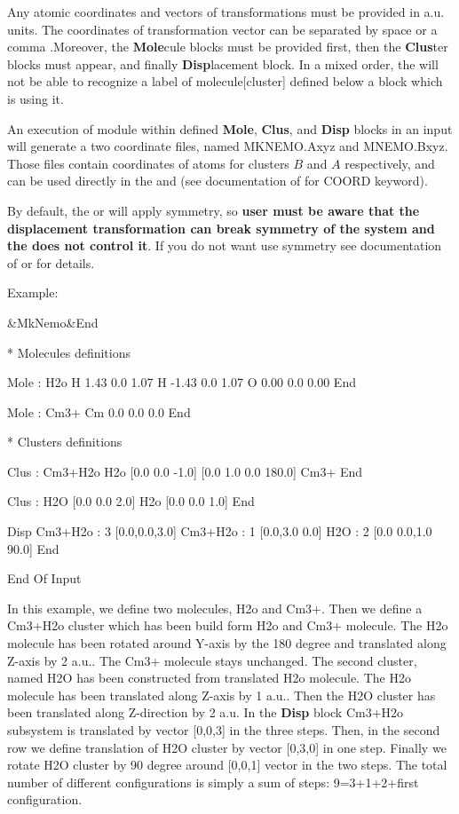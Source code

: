\begin{keywordlist}
Any atomic coordinates and vectors of transformations  must be provided in a.u. units. The coordinates of transformation vector can be separated by space or a comma .Moreover, the {\bf Mole}cule blocks must be provided first, then the {\bf Clus}ter blocks must appear, and finally  {\bf Disp}lacement block. In a mixed order, the  will not be able to recognize a label of molecule[cluster] defined below a block which is using it.

An execution of  module within defined {\bf Mole}, {\bf Clus}, and {\bf Disp} blocks in an input will generate a two coordinate files, named MKNEMO.Axyz and MNEMO.Bxyz. Those files contain coordinates of atoms for clusters $B$ and $A$ respectively, and can be used directly in the  and  (see documentation of  for COORD keyword).

By default, the  or  will apply symmetry, so {\bf user must be aware that the displacement transformation can break symmetry of the system and the  does not control it}. If you do not want use symmetry see documentation of  or  for details.

Example:
\begin{sourcelisting}
&MkNemo&End

  * Molecules definitions

  Mole : H2o
   H   1.43  0.0  1.07
   H  -1.43  0.0  1.07
   O   0.00  0.0  0.00
  End

  Mole : Cm3+
   Cm  0.0 0.0 0.0
  End

  * Clusters definitions

  Clus : Cm3+H2o
   H2o  [0.0 0.0 -1.0] [0.0 1.0 0.0 180.0]
   Cm3+
  End

  Clus : H2O [0.0 0.0 2.0]
   H2o  [0.0 0.0 1.0]
  End

  Disp
    Cm3+H2o   : 3 [0.0,0.0,3.0]
    Cm3+H2o   : 1 [0.0,3.0 0.0]
    H2O       : 2 [0.0 0.0,1.0 90.0]
  End


End Of Input
\end{sourcelisting}
In this example, we define two molecules, H2o and Cm3+. Then we define a Cm3+H2o cluster which has been build form H2o and Cm3+ molecule. The H2o molecule has been rotated around Y-axis by the 180 degree and translated along Z-axis by 2 a.u.. The Cm3+ molecule stays unchanged. The second cluster, named H2O has been constructed from translated H2o molecule. The H2o molecule has been translated along Z-axis by 1 a.u.. Then the H2O cluster has been translated along Z-direction by 2 a.u. In the {\bf Disp} block Cm3+H2o subsystem is translated by vector [0,0,3] in the three steps. Then, in the second row we define translation of H2O cluster by vector [0,3,0] in one step. Finally we rotate H2O cluster by 90 degree around [0,0,1] vector in the two steps. The total number of different configurations is simply a sum of steps: 9=3+1+2+first configuration.



\end{keywordlist}
